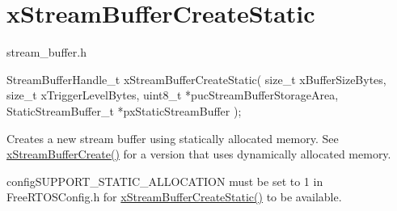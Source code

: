 \hypertarget{group__xStreamBufferCreateStatic}{}\section{x\+Stream\+Buffer\+Create\+Static}
\label{group__xStreamBufferCreateStatic}
stream\+\_\+buffer.\+h


\begin{DoxyPre}
StreamBufferHandle\_t xStreamBufferCreateStatic( size\_t xBufferSizeBytes,
                                                size\_t xTriggerLevelBytes,
                                                uint8\_t *pucStreamBufferStorageArea,
                                                StaticStreamBuffer\_t *pxStaticStreamBuffer );
\end{DoxyPre}
 Creates a new stream buffer using statically allocated memory. See \hyperlink{stream__buffer_8h_a39aa4dd8b83e2df7ded291f863fb5fed}{x\+Stream\+Buffer\+Create()} for a version that uses dynamically allocated memory.

config\+S\+U\+P\+P\+O\+R\+T\+\_\+\+S\+T\+A\+T\+I\+C\+\_\+\+A\+L\+L\+O\+C\+A\+T\+I\+ON must be set to 1 in Free\+R\+T\+O\+S\+Config.\+h for \hyperlink{stream__buffer_8h_a3c248575ac1b83801db605b32a118f77}{x\+Stream\+Buffer\+Create\+Static()} to be available.


